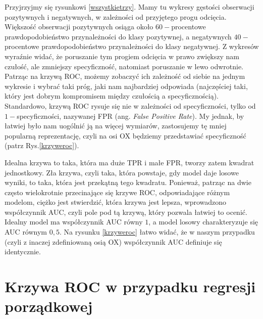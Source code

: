 \documentclass{mini}
\begin{document}
Przyjrzyjmy się rysunkowi \ref{wszystkietrzy}. Mamy tu wykresy gęstości obserwacji pozytywnych i negatywnych, w zależności od przyjętego progu odcięcia. Większość obserwacji pozytywnych osiąga około $60-$procentowe prawdopodobieństwo przynależności do klasy pozytywnej, a negatywnych $40-$procentowe prawdopodobieństwo przynależności do klasy negatywnej. Z wykresów wyraźnie widać, że poruszanie tym progiem odcięcia w prawo zwiększy nam czułość, ale zmniejszy specyficzność, natomiast poruszanie w lewo odwrotnie. Patrząc na krzywą ROC, możemy zobaczyć ich zależność od siebie na jednym wykresie i wybrać taki próg, jaki nam najbardziej odpowiada (najczęściej taki, który jest dobrym kompromisem między czułością a specyficznością). Standardowo, krzywą ROC rysuje się nie w zależności od specyficzności, tylko od $1-$specyficzności, nazywanej FPR (ang. \textit{False Positive Rate}). My jednak, by łatwiej było nam uogólnić ją na więcej wymiarów, zastosujemy tę mniej popularną reprezentację, czyli na osi OX będziemy przedstawiać specyficzność (patrz Rys.\ref{krzyweroc}). 

Idealna krzywa to taka, która ma duże TPR i małe FPR, tworzy zatem kwadrat jednostkowy. Zła krzywa, czyli taka, która powstaje, gdy model daje losowe wyniki, to taka, która jest przekątną tego kwadratu. Ponieważ, patrząc na dwie często wielokrotnie przecinające się krzywe ROC, odpowiadające różnym modelom, ciężko jest stwierdzić, która krzywa jest lepsza, wprowadzono współczynnik AUC, czyli pole pod tą krzywą, który pozwala łatwiej to ocenić. Idealny model ma współczynnik AUC równy $1$, a model losowy charakteryzuje się AUC równym $0,5$. Na rysunku \ref{krzyweroc} łatwo widać, że w naszym przypadku (czyli z inaczej zdefiniowaną osią OX) współczynnik AUC definiuje się identycznie.       

\section{Krzywa ROC w przypadku regresji porządkowej}
\end{document}
